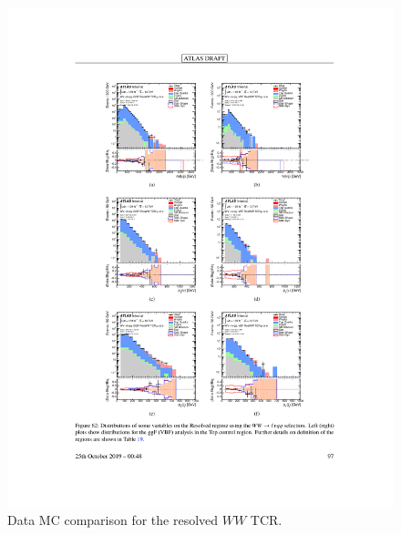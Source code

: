 \begin{figure}[h!]
  \centering
  \includegraphics[width=\hsize]{figures/Analysis/datamc/resolved_ww_tcr.pdf}
      \caption{Data MC comparison for the resolved $WW$ TCR.} 
  \label{fig:resolved_ww_TCR_datamc}
\end{figure} 
\FloatBarrier


